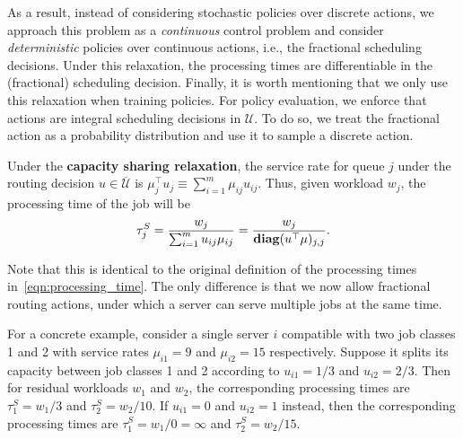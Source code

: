 As a result, instead of considering stochastic policies over discrete actions, we approach this problem as a \emph{continuous} control problem and consider
\emph{deterministic} policies over continuous actions, i.e., the fractional scheduling decisions. Under this relaxation, the processing times are differentiable in the (fractional) scheduling decision. Finally, it is worth mentioning that we only use this relaxation when training policies. For policy evaluation, we enforce that actions are integral scheduling decisions in $\mathcal{U}$. To do so, we treat the fractional action as a probability distribution and use it to sample a discrete action. 

\begin{definition}
\label{def:capacity-sharing}
Under the {\bf capacity sharing relaxation}, the service rate for queue $j$ under the routing decision $u\in\overline{\mathcal{U}}$ is $\mu_{j}^\top u_{j} \equiv \sum\nolimits_{i=1}^{m} \mu_{ij}u_{ij}$.
Thus, given workload $w_{j}$, the processing time of the job will be
\begin{equation}
\label{eq:capacity-sharing}
\tau^{S}_{j} =\frac{w_{j}}{\sum_{i=1}^{m}u_{ij}\mu_{ij}} = \frac{w_{j}}{\mathbf{diag}(u^\top \mu)_{j,j}}.
\end{equation}
\end{definition}
Note that this is identical to the original definition of the processing times in~\eqref{eqn:processing_time}. The only difference is that we now allow fractional routing actions, under which a server can serve multiple jobs at the same time.


For a concrete example, consider a single server $i$ compatible with two job classes 1 and 2 with service rates $\mu_{i1} = 9$ and $\mu_{i2} = 15$ respectively. Suppose it splits its capacity between job classes 1 and 2 according to $u_{i1} = 1/3$ and $u_{i2} = 2/3$. Then for residual workloads $w_1$ and $w_2$, the corresponding processing times are $\tau^{S}_{1}=w_1/3$ and $\tau^{S}_{2}=w_2/10$. If $u_{i1}=0$ and $u_{i2}=1$ instead, then the corresponding processing times are $\tau^{S}_{1}=w_1/0 = \infty$ and $\tau^{S}_{2}=w_2/15$. %

